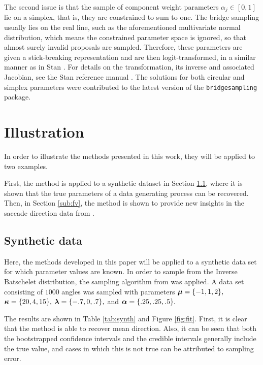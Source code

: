 The second issue is that the sample of component weight parameters \(\alpha_j \in [0, 1]\) lie on a simplex, that is, they are constrained to sum to one. The bridge sampling usually lies on the real line, such as the aforementioned multivariate normal distribution, which means the constrained parameter space is ignored, so that almost surely invalid proposals are sampled. Therefore, these parameters are given a stick-breaking representation and are then logit-transformed, in a similar manner as in Stan \citep{carpenter2017stan}. For details on the transformation, its inverse and associated Jacobian, see the Stan reference manual \citep{stanrefmanual}. The solutions for both circular and simplex parameters were contributed to the latest version of the \texttt{bridgesampling} package.




\section{Illustration}
\label{sec:ill}

In order to illustrate the methods presented in this work, they will be applied to two examples.

First, the method is applied to a synthetic dataset in Section \ref{sub:synth}, where it is shown that the true parameters of a data generating process can be recovered. Then, in Section \ref{sub:fv}, the method is shown to provide new insights in the saccade direction data from \citet{van2016infants}.


\subsection{Synthetic data}
\label{sub:synth}

Here, the methods developed in this paper will be applied to a synthetic data set for which parameter values are known. In order to sample from the Inverse Batschelet distribution, the sampling algorithm from \citet{jones2012inverse} was applied. A data set consisting of \(1000\) angles was sampled with parameters \(\boldsymbol{\mu} = \{-1, 1, 2\},\)  \(\boldsymbol{\kappa} = \{20, 4, 15\},\)  \(\boldsymbol{\lambda} = \{-.7, 0, .7\},\) and  \(\boldsymbol{\alpha} = \{ .25, .25, .5\}.\)

The results are shown in Table \ref{tab:synth} and Figure \ref{fig:fit}. First, it is clear that the method is able to recover mean direction. Also, it can be seen that both the bootstrapped confidence intervals and the credible intervals generally include the true value, and cases in which this is not true can be attributed to sampling error.


